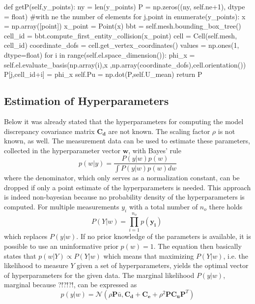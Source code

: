 \documentclass[%
  a4paper,oneside,%
  11pt,%
  smallchapters,
  green,%
  rgb, <cmyk>
  ,]{tubsbook}
\begin{document}
\begin{python}
def getP(self,y_points):
	ny = len(y_points)
	P = np.zeros((ny, self.ne+1), dtype = float) #with ne the number of elements
	for j,point in enumerate(y_points):
		x = np.array([point])
		x_point = Point(x)
		bbt = self.mesh.bounding_box_tree()
		cell_id = bbt.compute_first_entity_collision(x_point)
		cell = Cell(self.mesh, cell_id)
		coordinate_dofs = cell.get_vertex_coordinates()
		values = np.ones(1, dtype=float)
		for i in range(self.el.space_dimension()): 
			phi_x = self.el.evaluate_basis(np.array(i),x 
				,np.array(coordinate_dofs),cell.orientation())
			P[j,cell_id+i] = phi_x
	self.Pu = np.dot(P,self.U_mean)
	return P
\end{python}
\label{lst:getP}



\subsection{Estimation of Hyperparameters}
Below it was already stated that the hyperparameters for computing the model discrepancy covariance matrix $\bm{C_d}$ are not known. The scaling factor $\rho$ is not known, as well. The measurement data can be used to estimate these parameters, collected in the hyperparameter vector $\bm{w}$, with Bayes' rule 
%
\begin{equation}
p(w|y) = \frac{P(y|w) p(w)}{\int P(y|w) p(w) dw}
\end{equation}
%
where the denominator, which only serves as a normalization constant, can be dropped if only a point estimate of the hyperparameters is needed. This approach is indeed non-bayesian because no probability density of the hyperparameters is computed. For multiple measurements $y_i$ with a total number of $n_o$ there holds 
\begin{equation}
P(Y|w) = \prod_{i=1}^{n_o} p(\bm{y_i}) \; 
\end{equation}
which replaces $P(y|w)$.
If no prior knowledge of the parameters is available, it is possible to use an uninformative prior $p(w) = 1$.
The equation then basically states that $p(w|Y) \propto P(Y|w)$ which means that maximizing  $P(Y|w)$, i.e. the likelihood to measure $Y$ given a set of hyperparameters, yields the optimal vector of hyperparameters for the given data. 
The marginal likelihood $P(y|w)$, marginal because ?!?!?!, can be expressed as 
\begin{equation}
p(y|w) = \mathcal{N}(\rho \bm{P}\bar{u}, \bm{C_d}+\bm{C_e} + \rho^2 \bm{P} \bm{C_u} \bm{P}^T)
\end{equation}
\end{document}

